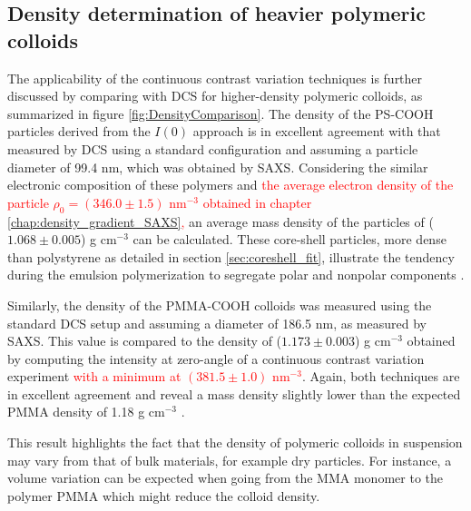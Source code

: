 \subsection{Density determination of heavier polymeric colloids}
The applicability of the continuous contrast variation techniques is further discussed by comparing with DCS for higher-density polymeric colloids, as summarized in figure \ref{fig:DensityComparison}. The density of the PS-COOH particles derived from the $I(0)$ approach is in excellent agreement with that measured by DCS using a standard configuration and assuming a particle diameter of 99.4 nm, which was obtained by SAXS. Considering the similar electronic composition of these polymers and \textcolor{red}{the average electron density of the particle $\rho_0=\left( 346.0\pm1.5\right)$ nm\(^{-3}\) obtained in chapter \ref{chap:density_gradient_SAXS},} an average mass density of the particles of ($1.068\pm0.005$) g cm$^{-3}$ can be calculated. These core-shell particles, more dense than polystyrene as detailed in section \ref{sec:coreshell_fit}, illustrate the tendency during the emulsion polymerization to segregate polar and nonpolar components \citep{dingenouts_structure_1994}.

Similarly, the density of the PMMA-COOH colloids was measured using the standard DCS setup and assuming a diameter of 186.5 nm, as measured by SAXS. This value is compared to the density of ($1.173\pm0.003$) g cm$^{-3}$ obtained by computing the intensity at zero-angle of a continuous contrast variation experiment \textcolor{red}{with a minimum at $\left( 381.5\pm1.0\right)$ nm\(^{-3}\)}. Again, both techniques are in excellent agreement and reveal a mass density slightly lower than the expected PMMA density of 1.18 g cm$^{-3}$ \citep{dingenouts_analysis_1999}.

This result highlights the fact that the density of polymeric colloids in suspension may vary from that of bulk materials, for example dry particles. For instance, a volume variation can be expected when going from the MMA monomer to the polymer PMMA \citep{nichols_prediction_1950} which might reduce the colloid density.
